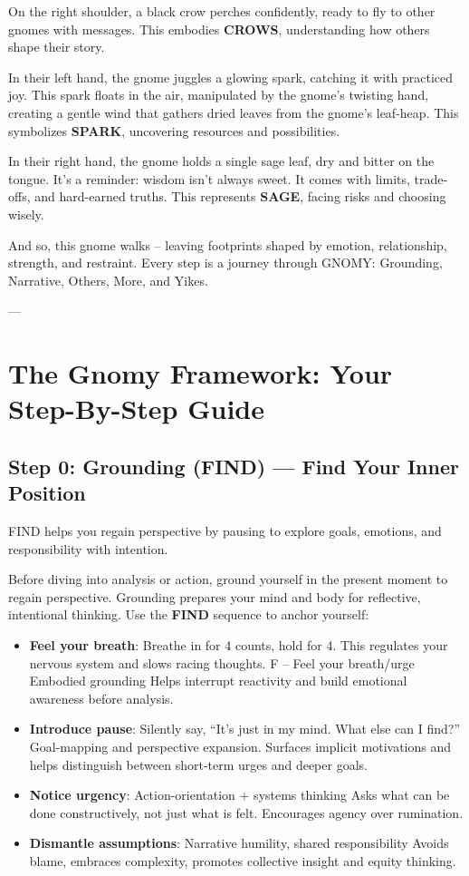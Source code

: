 \documentclass{article}
\begin{document}
On the right shoulder, a black crow perches confidently, ready to fly to other gnomes with messages. This embodies \textbf{CROWS}, understanding how others shape their story.

In their left hand, the gnome juggles a glowing spark, catching it with practiced joy. This spark floats in the air, manipulated by the gnome's twisting hand, creating a gentle wind that gathers dried leaves from the gnome's leaf-heap. This symbolizes \textbf{SPARK}, uncovering resources and possibilities.

In their right hand, the gnome holds a single sage leaf, dry and bitter on the tongue. It's a reminder: wisdom isn't always sweet. It comes with limits, trade-offs, and hard-earned truths. This represents \textbf{SAGE}, facing risks and choosing wisely.

And so, this gnome walks -- leaving footprints shaped by emotion, relationship, strength, and restraint. Every step is a journey through GNOMY: Grounding, Narrative, Others, More, and Yikes.

---

\section{The Gnomy Framework: Your Step-By-Step Guide}

\subsection{Step 0: Grounding (FIND) — Find Your Inner Position}
FIND helps you regain perspective by pausing to explore goals, emotions, and responsibility with intention.

Before diving into analysis or action, ground yourself in the present moment to regain perspective. Grounding prepares your mind and body for reflective, intentional thinking. Use the \textbf{FIND} sequence to anchor yourself:
\begin{itemize}[noitemsep,topsep=0pt]
    \item \textbf{Feel your breath}: Breathe in for 4 counts, hold for 4. This regulates your nervous system and slows racing thoughts. F – Feel your breath/urge	Embodied grounding	Helps interrupt reactivity and build emotional awareness before analysis.
    \item \textbf{Introduce pause}: Silently say, ``It's just in my mind. What else can I find?'' Goal-mapping and perspective expansion. Surfaces implicit motivations and helps distinguish between short-term urges and deeper goals.
    \item \textbf{Notice urgency}: Action-orientation + systems thinking	Asks what can be done constructively, not just what is felt. Encourages agency over rumination.
    \item \textbf{ Dismantle assumptions}: Narrative humility, shared responsibility	Avoids blame, embraces complexity, promotes collective insight and equity thinking.
\end{itemize}
\end{document}
